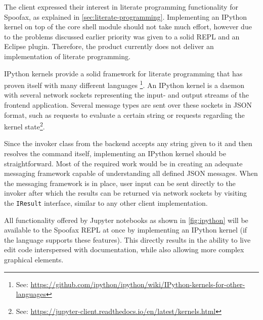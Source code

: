The client expressed their interest in literate programming functionality for
Spoofax, as explained in \cref{sec:literate-programming}. Implementing an
IPython kernel on top of the core shell module should not take much effort,
however due to the problems discussed earlier priority was given to a solid
REPL and an Eclipse plugin. Therefore, the product currently does not deliver an
implementation of literate programming.

IPython kernels provide a solid framework for literate programming that has
proven itself with many different languages%
\footnote{See: \url{https://github.com/ipython/ipython/wiki/IPython-kernels-for-other-languages}}.
An IPython kernel is a daemon with several network sockets
representing the input- and output streams of the frontend application. Several
message types are sent over these sockets in JSON format, such as requests to
evaluate a certain string or requests regarding the kernel
state\footnote{See: \url{https://jupyter-client.readthedocs.io/en/latest/kernels.html}}.

Since the invoker class from the backend accepts any string given to it and then
resolves the command itself, implementing an IPython kernel should be
straightforward. Most of the required work would be in creating an adequate
messaging framework capable of understanding all defined JSON messages. When the
messaging framework is in place, user input can be sent directly to the invoker
after which the results can be returned via network sockets by visiting the
\texttt{IResult} interface, similar to any other client implementation.

All functionality offered by Jupyter notebooks as shown in \cref{fig:ipython}
will be available to the Spoofax REPL at once by implementing an IPython kernel
(if the language supports these features). This directly results in the
ability to live edit code interspersed with documentation, while also allowing
more complex graphical elements.

